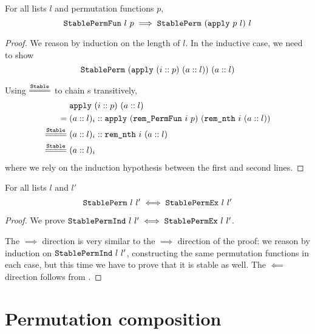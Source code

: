 \documentclass[sigplan,10pt,anonymous,review]{thesis}
\begin{document}
\begin{theorem}
  \label{thm:apply_correct_stable}
  For all lists $l$ and permutation functions $p$,
  \begin{equation*}
    \texttt{\textup{StablePermFun}}~l~p \implies \texttt{\textup{StablePerm}}~(\texttt{\textup{apply}}~p~l)~l
  \end{equation*}
\end{theorem}
\begin{proof}
  We reason by induction on the length of $l$. In the inductive case,
  we need to show
  \begin{equation*}
    \texttt{\textup{StablePerm}}~(\texttt{\textup{apply}}~(i :: p)~(a :: l))~(a :: l)
  \end{equation*}

  Using $\eqstable$ to chain s transitively,
  \begin{align*}
    {}& \var{apply}~(i :: p)~(a :: l) \\
    ={}& (a :: l)_i  ::
    \var{apply}~(\var{rem\_PermFun}~i~p)~(\var{rem\_nth}~i~(a :: l)) \\
    \eqstable{}& (a :: l)_i :: \var{rem\_nth}~i~(a :: l) \\
    \eqstable{}& (a :: l)_i
  \end{align*}
  where we rely on the induction hypothesis between the first and
  second lines.
\end{proof}

\begin{theorem}
  For all lists $l$ and $l'$
  \begin{equation*}
    \texttt{\textup{StablePerm}}~l~l' \iff \texttt{\textup{StablePermEx}}~l~l'
  \end{equation*}
\end{theorem}
\begin{proof}
  We prove $\texttt{\textup{StablePermInd}}~l~l' \iff \texttt{\textup{StablePermEx}}~l~l'$.

  The $\implies$ direction is very similar to the $\implies$ direction
  of the  proof: we reason by induction on
  $\texttt{\textup{StablePermInd}}~l~l'$, constructing the same permutation
  functions in each case, but this time we have to prove that it is
  stable as well. The $\impliedby$ direction follows from
  .
\end{proof}


\section{Permutation composition}
\label{appendix:perm_comp}
\end{document}

